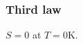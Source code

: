 \documentclass{article}
\begin{document}
\begin{multicols*}{3}
\subsubsection*{Third law}
$S=0$ at $T=0$K.

\end{multicols*}
\end{document}
